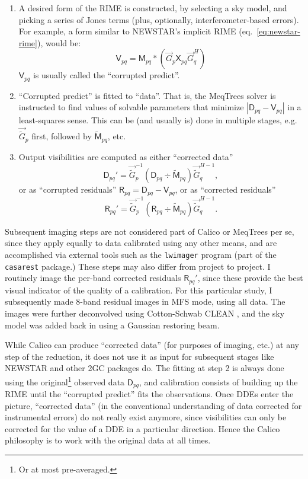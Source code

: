 \documentclass[]{aa}
\newcommand{\herm}{H}
\newcommand{\jones}[2]{\vec {#1}_{#2}}
\newcommand{\jonesinv}[2]{\vec {#1}^{-1}_{#2}}
\newcommand{\jonesT}[2]{\vec {#1}^{\herm}_{#2}}
\newcommand{\jonesTinv}[2]{\vec {#1}^{{\herm}-1}_{#2}}
\newcommand{\coh}[2]{\mathsf{{#1}}_{{#2}}}
\begin{document}
\begin{enumerate}
\item A desired form of the RIME is constructed, by selecting a sky model, and picking a series of Jones terms (plus, optionally, interferometer-based errors). For example, a form similar to NEWSTAR's implicit RIME (eq.~\ref{eq:newstar-rime}), would be:
\[
\coh{V}{pq} =  \coh{M}{pq} \ast ( \jones{G}{p} \coh{X}{pq} \jonesT{G}{q} ) 
\]
$\coh{V}{pq}$ is usually called the ``corrupted predict''.
\item ``Corrupted predict'' is fitted to ``data''. That is, the MeqTrees solver is instructed to find values of solvable parameters that minimize $|\coh{D}{pq}-\coh{V}{pq}|$ in a least-squares sense. This can be (and usually is) done in multiple stages, e.g. $\jones{\tilde{G}}{p}$ first, followed by $\coh{\tilde{M}}{pq}$, etc.
\item Output visibilities are computed as either ``corrected data''
\[
\coh{D}{pq}' = \jonesinv{\tilde{G}}{p} (\coh{D}{pq} \div \coh{\tilde{M}}{pq}) \jonesTinv{\tilde{G}}{q},
\]
or as ``corrupted residuals'' $\coh{R}{pq} = \coh{D}{pq}-\coh{V}{pq}$, or as ``corrected residuals''
\[
\coh{R}{pq}' = \jonesinv{\tilde{G}}{p} (\coh{R}{pq} \div \coh{\tilde{M}}{pq}) \jonesTinv{\tilde{G}}{q}.
\]
\end{enumerate}

Subsequent imaging steps are not considered part of Calico or MeqTrees per se, since they apply equally to data calibrated using any other means, and are accomplished via external tools such as the {\tt lwimager} program (part of the {\tt casarest} package.) These steps may also differ from project to project. I routinely image the per-band corrected residuals $\coh{R}{pq}'$, since these provide the best visual indicator of the quality of a calibration. For this particular study, I subsequently made 8-band residual images in MFS mode, using all data. The images were further deconvolved using Cotton-Schwab CLEAN \citep{Schwab:csclean}, and the sky model was added back in using a Gaussian restoring beam.

While Calico can produce ``corrected data'' (for purposes of imaging, etc.) at any step of the reduction, it does not use it as input for subsequent stages like NEWSTAR and other 2GC packages do. The fitting at step 2 is always done using the original\footnote{Or at most pre-averaged.} observed data $\coh{D}{pq}$, and calibration consists of building up the RIME until the ``corrupted predict'' fits the observations. Once DDEs enter the picture, ``corrected data'' (in the conventional understanding of data corrected for instrumental errors) do not really exist anymore, since visibilities can only be corrected for the value of a DDE in a particular direction. Hence the Calico philosophy is to work with the original data at all times.
\end{document}
